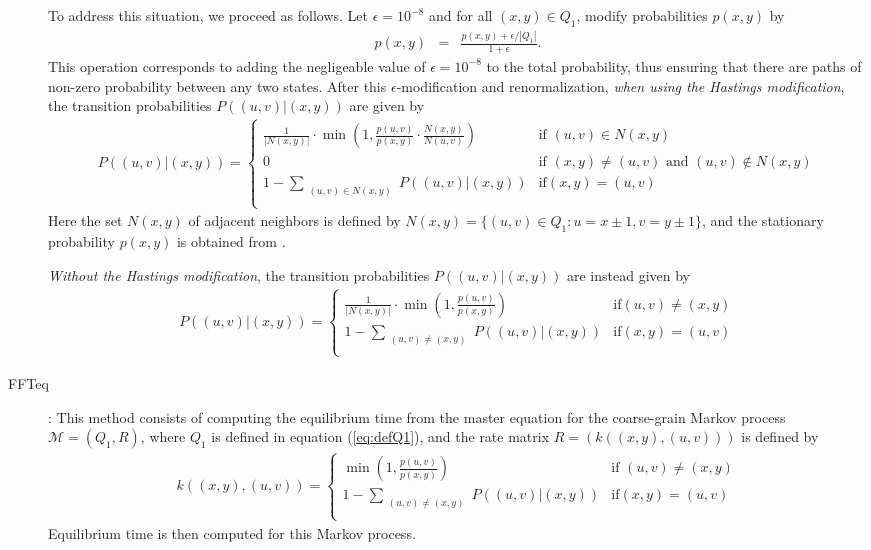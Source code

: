 \begin{description}
To address this situation, we proceed as follows. Let $\epsilon =
10^{-8}$ and for all $(x,y) \in Q_1$, modify probabilities $p(x,y)$ by
\begin{align}
\label{eq:modifyNormalizeCellProb} p(x,y) &=& \frac{p(x,y) +
\epsilon/|Q_1|}{1+\epsilon }.
\end{align}
This operation corresponds to adding the negligeable value of
$\epsilon=10^{-8}$ to the total probability, thus ensuring that there
are paths of non-zero probability between any two states. After this
$\epsilon$-modification and renormalization, {\em when using the
Hastings modification}, the transition probabilities $P( (u,v) | (x,y)
)$ are given by
\begin{align}
\label{eq:transitionProbabilityFFTbor2DwithHastings} P( (u,v) |(x,y)
) = \left\{
\begin{array}{ll}
\frac{1}{|N(x,y)|} \cdot \min(1, \frac{p(u,v)}{p(x,y)} \cdot
\frac{N(x,y)}{N(u,v)}) &\mbox{if $(u,v) \in N(x,y)$}\\
0 &\mbox{if $(x,y) \ne (u,v) \mbox{ and } (u,v) \not\in N(x,y)$}\\
1 - \sum_{\substack{(u,v) \in N(x,y)}} P( (u,v) | (x,y) ) &\mbox{if
$(x,y) =(u,v)$}\\
\end{array}
\right.
\end{align}
Here the set $N(x,y)$ of adjacent neighbors is defined by $N(x,y) = \{
(u,v) \in Q_1 : u = x \pm 1, v = y \pm 1 \}$, and the stationary
probability $p(x,y)$ is obtained from \ffttwo.

{\em Without the Hastings modification}, the transition probabilities
$P( (u,v) | (x,y) )$ are instead given by
\begin{align}
\label{eq:transitionProbabilityFFTbor2DwithoutHastings} P( (u,v)
|(x,y) ) = \left\{
\begin{array}{ll}
\frac{1}{|N(x,y)|} \cdot \min(1, \frac{p(u,v)}{p(x,y)}) &\mbox{if
$(u,v) \ne (x,y)$}\\
1 - \sum_{\substack{(u,v) \ne (x,y)}} P( (u,v) | (x,y) ) &\mbox{if
$(x,y) =(u,v)$}\\
\end{array}
\right.
\end{align}

\item[FFTeq]: This method consists of computing the equilibrium time
from the master equation for the coarse-grain Markov process
$\mathcal{M}=(Q_1,R)$, where $Q_1$ is defined in equation
(\ref{eq:defQ1}), and the rate matrix $R = ( k( (x,y), (u,v) ) )$ is
defined by
\begin{align}
\label{eq:rateProbabilityFFTbor2DwithoutHastings} k( (x,y), (u,v) ) =
\left\{
\begin{array}{ll}
\min(1, \frac{p(u,v)}{p(x,y)}) &\mbox{if $(u,v) \ne (x,y)$}\\
1 - \sum_{\substack{(u,v) \ne (x,y)}} P( (u,v) | (x,y) ) &\mbox{if
$(x,y) =(u,v)$}\\
\end{array}
\right.
\end{align}
Equilibrium time is then computed for this Markov process.


\end{description}
